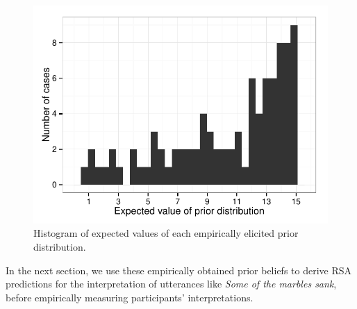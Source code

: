 \documentclass[10pt,letterpaper]{article}
\newcommand{\red}[1]{\textcolor{Red}{#1}}
\begin{document}
\begin{figure}
	\includegraphics[width=.5\textwidth]{pics/priorexpectations-histogram}	
	\caption{Histogram of expected values of each empirically elicited prior distribution.}
	\label{fig:probhist}	
\end{figure}

In the next section, we use these empirically obtained prior beliefs to derive RSA predictions for the interpretation of utterances like \emph{Some of the marbles sank}, before empirically measuring participants' interpretations.





 

\end{document}
